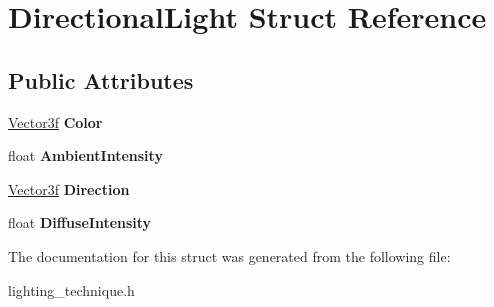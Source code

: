 \hypertarget{structDirectionalLight}{\section{Directional\-Light Struct Reference}
\label{structDirectionalLight}
}
\subsection*{Public Attributes}
\begin{DoxyCompactItemize}
\item 
\hypertarget{structDirectionalLight_a4fd9e75b57df50471d19fe830dd30ef1}{\hyperlink{structVector3f}{Vector3f} {\bfseries Color}}\label{structDirectionalLight_a4fd9e75b57df50471d19fe830dd30ef1}

\item 
\hypertarget{structDirectionalLight_a201a586adf416c65cc017f1549753612}{float {\bfseries Ambient\-Intensity}}\label{structDirectionalLight_a201a586adf416c65cc017f1549753612}

\item 
\hypertarget{structDirectionalLight_a4971d26a6f2f4a4c5b7cee724b9516af}{\hyperlink{structVector3f}{Vector3f} {\bfseries Direction}}\label{structDirectionalLight_a4971d26a6f2f4a4c5b7cee724b9516af}

\item 
\hypertarget{structDirectionalLight_a53f3ba9e4df1a218949483c253693397}{float {\bfseries Diffuse\-Intensity}}\label{structDirectionalLight_a53f3ba9e4df1a218949483c253693397}

\end{DoxyCompactItemize}


The documentation for this struct was generated from the following file\-:\begin{DoxyCompactItemize}
\item 
lighting\-\_\-technique.\-h\end{DoxyCompactItemize}
